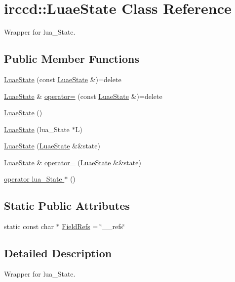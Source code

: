 \hypertarget{a00043}{\section{irccd\-:\-:Luae\-State Class Reference}
\label{a00043}
}


Wrapper for lua\-\_\-\-State.  


\subsection*{Public Member Functions}
\begin{DoxyCompactItemize}
\item 
\hyperlink{a00043_a3674121eb449dec3149016d70d0988c2}{Luae\-State} (const \hyperlink{a00043}{Luae\-State} \&)=delete
\item 
\hyperlink{a00043}{Luae\-State} \& \hyperlink{a00043_af01d3f62b6c21097ee08e22c1ed34be0}{operator=} (const \hyperlink{a00043}{Luae\-State} \&)=delete
\item 
\hyperlink{a00043_a7d29813d06bca527d2052c2396d6f6b1}{Luae\-State} ()
\item 
\hyperlink{a00043_a17571c0855154ccd52643f2fa6ec4916}{Luae\-State} (lua\-\_\-\-State $\ast$L)
\item 
\hyperlink{a00043_aac38c8a075b6796bb70ea4a475de12bf}{Luae\-State} (\hyperlink{a00043}{Luae\-State} \&\&state)
\item 
\hyperlink{a00043}{Luae\-State} \& \hyperlink{a00043_a437c3461df29146181ee68967fab5be1}{operator=} (\hyperlink{a00043}{Luae\-State} \&\&state)
\item 
\hyperlink{a00043_a10202aa62a190df7c182e4783815ba71}{operator lua\-\_\-\-State $\ast$} ()
\end{DoxyCompactItemize}
\subsection*{Static Public Attributes}
\begin{DoxyCompactItemize}
\item 
static const char $\ast$ \hyperlink{a00043_aa7b1d02614133b1cef787b5b6ff3c177}{Field\-Refs} = \char`\"{}\-\_\-\-\_\-refs\char`\"{}
\end{DoxyCompactItemize}


\subsection{Detailed Description}
Wrapper for lua\-\_\-\-State. 

